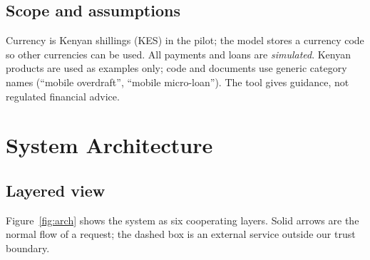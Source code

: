 \documentclass[10pt,a4paper]{article}
\begin{document}
\subsection{Scope and assumptions}
Currency is Kenyan shillings (KES) in the pilot; the model stores a currency code so other currencies can be used. All payments and loans are \emph{simulated}. Kenyan products are used as examples only; code and documents use generic category names (``mobile overdraft'', ``mobile micro-loan''). The tool gives guidance, not regulated financial advice.

\section{System Architecture}
\label{sec:arch}

\subsection{Layered view}
Figure~\ref{fig:arch} shows the system as six cooperating layers. Solid arrows are the normal flow of a request; the dashed box is an external service outside our trust boundary.
\end{document}
